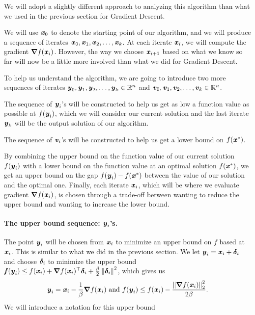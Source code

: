 
We will adopt a slightly different approach to analyzing this
algorithm than what we used in the previous section for Gradient Descent.

We will use $\boldsymbol{\mathit{x}}_0$ to denote the starting point of our algorithm, and
we will produce a sequence of iterates $\boldsymbol{\mathit{x}}_0, \boldsymbol{\mathit{x}}_1, \boldsymbol{\mathit{x}}_2, \ldots,
\boldsymbol{\mathit{x}}_k $.
At each iterate $\boldsymbol{\mathit{x}}_{i}$, we will compute the gradient $\boldsymbol{\nabla}
f(\boldsymbol{\mathit{x}}_{i})$.
However, the way we choose  $\boldsymbol{\mathit{x}}_{i+1}$ based on what we know so far
will now be a little more involved than what we did for Gradient Descent.

To help us understand the algorithm, we are going to introduce two
more sequences of iterates $\boldsymbol{\mathit{y}}_0, \boldsymbol{\mathit{y}}_1, \boldsymbol{\mathit{y}}_2, \ldots,
\boldsymbol{\mathit{y}}_k \in \mathbb{R}^n $ and $\boldsymbol{\mathit{v}}_0, \boldsymbol{\mathit{v}}_1, \boldsymbol{\mathit{v}}_2, \ldots,
\boldsymbol{\mathit{v}}_k \in \mathbb{R}^n$.

The sequence of $\boldsymbol{\mathit{y}}_i$'s will be constructed to help us get as low a
function value as possible at $f(\boldsymbol{\mathit{y}}_i)$, which we will consider our
current solution and the last iterate $\boldsymbol{\mathit{y}}_k$ will be the output solution of
our algorithm.

The sequence of $\boldsymbol{\mathit{v}}_i$'s will be constructed to help us get a lower
bound on $f(\boldsymbol{\mathit{x}}^*)$.

By combining the upper bound on the function value of our current
solution $f(\boldsymbol{\mathit{y}}_i)$ with a lower bound on the function value at an
optimal solution $f(\boldsymbol{\mathit{x}}^*)$, we get an upper bound on the gap
 $f(\boldsymbol{\mathit{y}}_i)-f(\boldsymbol{\mathit{x}}^*)$
between
the value of our solution and the optimal one.
Finally, each iterate $\boldsymbol{\mathit{x}}_i$, which will be where we evaluate
gradient $\boldsymbol{\nabla} f(\boldsymbol{\mathit{x}}_{i})$, is chosen through a trade-off between
wanting to reduce the upper bound and wanting to increase the lower bound.


\paragraph{The upper bound sequence: $\boldsymbol{\mathit{y}}_i$'s.}
The point $\boldsymbol{\mathit{y}}_i$ will be chosen from $\boldsymbol{\mathit{x}}_i$ to minimize an upper
bound on $f$ based at $\boldsymbol{\mathit{x}}_i$.
This is similar to what we did in the previous section.
We let $\boldsymbol{\mathit{y}}_i = \boldsymbol{\mathit{x}}_i +\boldsymbol{\delta}_i$
and choose $\boldsymbol{\delta}_i$ to minimize the upper bound
$ \boldsymbol{\mathit{f}}(\boldsymbol{\mathit{y}}_i) \leq f(\boldsymbol{\mathit{x}}_{i})  + \boldsymbol{\nabla} f(\boldsymbol{\mathit{x}}_{i})^\top\boldsymbol{\delta}_i
      + \frac{\beta}{2} \left\| \boldsymbol{\delta}_i \right\|^2$, which gives us
\[
  \boldsymbol{\mathit{y}}_i = \boldsymbol{\mathit{x}}_{i}-\frac{1}{\beta}\boldsymbol{\nabla} f(\boldsymbol{\mathit{x}}_{i})
  \text{ and }
    f(\boldsymbol{\mathit{y}}_i) \leq f(\boldsymbol{\mathit{x}}_{i}) - \frac{\left\| \boldsymbol{\nabla}
                 f(\boldsymbol{\mathit{x}}_{i}) \right\|_2^2}{2\beta}
  .
\]
We will introduce a notation for this upper bound

